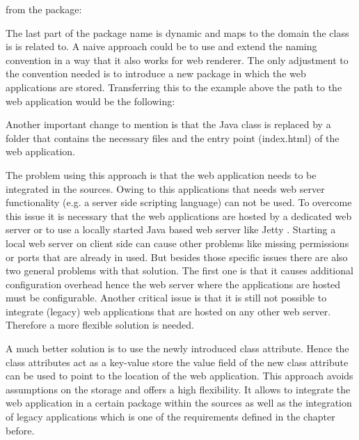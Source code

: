 \indent \centerline{}

from the package:  

\indent \centerline{}

The last part of the package name is dynamic and maps to the domain the class is is related to. A naive approach could be to use and extend the naming convention in a way that it also works for web renderer.
The only adjustment to the convention needed is to introduce a new package in which the web applications are stored.
Transferring this to the example above the path to the web application would be the following:

\indent \centerline{}

Another important change to mention is that the Java class is replaced by a folder that contains the necessary files and the entry point (index.html) of the web application.

The problem using this approach is that the web application needs to be integrated in the sources.
Owing to this applications that needs web server functionality (e.g.
a server side scripting language) can not be used.
To overcome this issue it is necessary that the web applications are hosted by a dedicated web server or to use a locally started Java based web server like Jetty \autocite{conception:jetty}.
Starting a local web server on client side can cause other problems like missing permissions or ports that are already in used.
But besides those specific issues there are also two general problems with that solution.
The first one is that it causes additional configuration overhead hence the web server where the applications are hosted must be configurable.
Another critical issue is that it is still not possible to integrate (legacy) web applications that are hosted on any other web server.
Therefore a more flexible solution is needed.

A much better solution is to use the newly introduced class attribute.
Hence the class attributes act as a key-value store the value field of the new class attribute can be used to point to the location of the web application.
This approach avoids assumptions on the storage and offers a high flexibility.
It allows to integrate the web application in a certain package within the sources as well as the integration of legacy applications which is one of the requirements defined in the chapter before.

